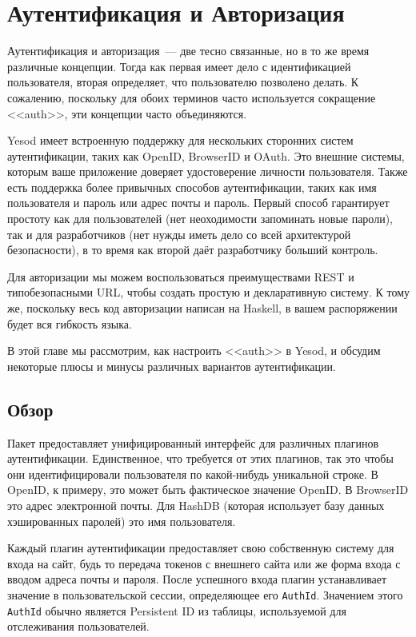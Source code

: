 \chapter{Аутентификация и Авторизация}\label{chap:auth}

Аутентификация и авторизация~--- две тесно связанные, но в то же время
различные концепции. Тогда как первая имеет дело с идентификацией пользователя,
вторая определяет, что пользователю позволено делать. К сожалению, поскольку
для обоих терминов часто используется сокращение <<auth>>, эти концепции часто
объединяются.

Yesod имеет встроенную поддержку для нескольких сторонних систем
аутентификации, таких как OpenID, BrowserID и OAuth. Это внешние системы,
которым ваше приложение доверяет удостоверение личности пользователя. Также
есть поддержка более привычных способов аутентификации, таких как имя
пользователя и пароль или адрес почты и пароль. Первый способ гарантирует
простоту как для пользователей (нет неоходимости запоминать новые пароли), так
и для разработчиков (нет нужды иметь дело со всей архитектурой безопасности), в
то время как второй даёт разработчику больший контроль.

Для авторизации мы можем воспользоваться преимуществами REST и типобезопасными
URL, чтобы создать простую и декларативную систему. К тому же, поскольку весь
код авторизации написан на Haskell, в вашем распоряжении будет вся гибкость
языка.

В этой главе мы рассмотрим, как настроить <<auth>> в Yesod, и обсудим некоторые
плюсы и минусы различных вариантов аутентификации.

\section{Обзор}


Пакет 
предоставляет унифицированный интерфейс для различных плагинов аутентификации.
Единственное, что требуется от этих плагинов, так это чтобы они
идентифицировали пользователя по какой-нибудь уникальной строке. В OpenID, к
примеру, это может быть фактическое значение OpenID. В BrowserID это адрес
электронной почты. Для HashDB (которая использует базу данных хэшированных
паролей) это имя пользователя.

Каждый плагин аутентификации предоставляет свою собственную систему для входа
на сайт, будь то передача токенов с внешнего сайта или же форма входа с вводом
адреса почты и пароля. После успешного входа плагин устанавливает значение в
пользовательской сессии, определяющее его \lstinline'AuthId'. Значением этого
\lstinline'AuthId' обычно является Persistent ID из таблицы, используемой для
отслеживания пользователей.

